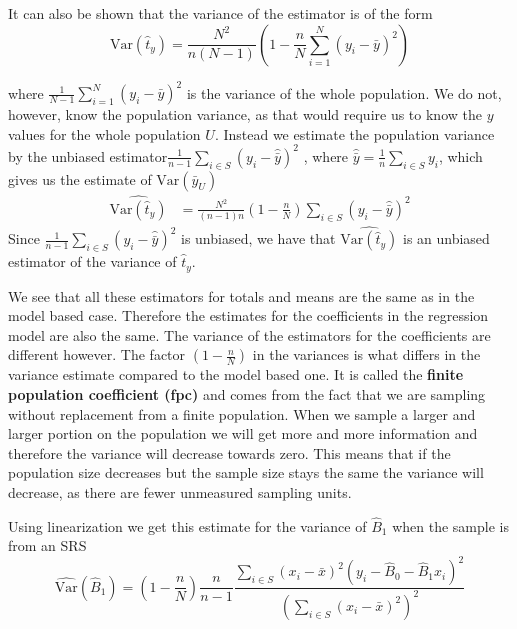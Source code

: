 \documentclass{article}
\begin{document}
It can also be shown that the variance of the estimator is of the form \begin{equation*}
\mathrm{Var} \left( \hat{t}_y \right) = \frac{N^2}{n \left( N - 1 \right)} \left( 1 - \frac{n}{N} \sum_{i = 1}^N (y_i - \bar{y})^2 
\right)
\end{equation*}

where
\(
\frac{1}{N - 1} \sum_{i = 1}^N (y_i - \bar{y})^2
\)
is the variance of the whole population.
We do not, however, know the population variance, as that would require us to know the \(y\) values
for the whole population \(U\). Instead we estimate the population variance by the unbiased estimator\(
 \frac{1}{n - 1} \sum_{i \in S} \left( y_i - \hat{\bar{y}} \right)^2
\)
, where \(\hat{\bar{y}} = \frac{1}{n} \sum_{i \in S} y_i \), which gives us the estimate of \(\mathrm{Var}(\bar{y}_U)\)\begin{align*}
 \widehat{\mathrm{Var}(\hat{t}_y)}
 &=\frac{N^2}{\left( n - 1 \right)n} \left( 1 - \frac{n}{N} \right) \sum_{i \in S} \left( y_i - \hat{\bar{y}} \right)^2
\end{align*}
Since \(\frac{1}{n - 1} \sum_{i \in S} \left( y_i - \hat{\bar{y}} \right)^2\) is unbiased, we have that \(\widehat{\mathrm{Var}(\hat{t}_y)}\) is an unbiased estimator of the variance of \(\hat{t}_y\).

We see that all these estimators for totals and means are the same as in the
model based case. Therefore the estimates for the coefficients in the regression
model are also the same. The variance of the estimators for the coefficients are
different however.
The factor \(\left( 1 - \frac{n}{N} \right)\) in the variances is what differs in
the variance estimate compared to the model based one. It is called the
\textbf{finite population coefficient (fpc)} and comes from the fact that we are
sampling without replacement from a finite population.
When we sample a larger and larger portion on the population we will get more
and more information and therefore the variance will decrease towards zero.
This means that if the population size decreases but the sample size stays the
same the variance will decrease, as there are fewer unmeasured sampling units.

Using linearization we get this estimate for the variance of \(\hat{B}_1\) when
the sample is from an SRS\begin{equation*}
\widehat{\mathrm{Var}}(\hat{B}_1) = \left( 1 - \frac{n}{N} \right) \frac{n}{n - 1} \frac{\sum_{i \in S} \left( x_i - \bar{x} \right)^2 \left( y_i - \hat{B}_0 - \hat{B}_1 x_i \right)^2}
{\left( \sum_{i \in S} \left( x_i - \bar{x} \right)^2 \right)^2}
\end{equation*}
\end{document}

